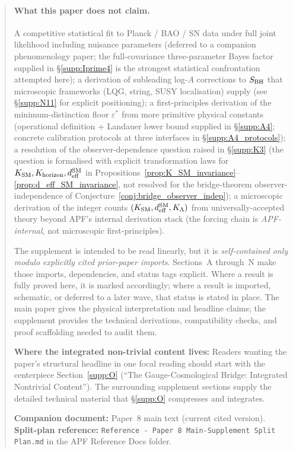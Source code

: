 \documentclass[11pt]{article}
\theoremstyle{plain}
\theoremstyle{definition}
\theoremstyle{remark}
\begin{document}
\begin{abstract}
\paragraph{What this paper does not claim.}  A competitive statistical fit to Planck / BAO / SN data under full joint likelihood including nuisance parameters (deferred to a companion phenomenology paper; the full-covariance three-parameter Bayes factor supplied in \S\ref{supp:Iprime4} is the strongest statistical confrontation attempted here); a derivation of subleading log-$A$ corrections to $S_{\rm BH}$ that microscopic frameworks (LQG, string, SUSY localisation) supply (see \S\ref{supp:N11} for explicit positioning); a first-principles derivation of the minimum-distinction floor $\varepsilon^*$ from more primitive physical constants (operational definition + Landauer lower bound supplied in \S\ref{supp:A4}; concrete calibration protocols at three interfaces in \S\ref{supp:A4_protocols}); a resolution of the observer-dependence question raised in \S\ref{supp:K3} (the question is formalised with explicit transformation laws for $K_{\rm SM}, K_{\rm horizon}, d_{\rm eff}^{\rm SM}$ in Propositions~\ref{prop:K_SM_invariance}--\ref{prop:d_eff_SM_invariance}, not resolved for the bridge-theorem observer-independence of Conjecture~\ref{conj:bridge_observer_indep}); a microscopic derivation of the integer counts $(K_{\rm SM}, d_{\rm eff}^{\rm SM}, K_\Lambda)$ from universally-accepted theory beyond APF's internal derivation stack (the forcing chain is \emph{APF-internal}, not microscopic first-principles).

\medskip

\noindent The supplement is intended to be read linearly, but it is \emph{self-contained only modulo explicitly cited prior-paper imports}.  Sections~A through~N make those imports, dependencies, and status tags explicit.  Where a result is fully proved here, it is marked accordingly; where a result is imported, schematic, or deferred to a later wave, that status is stated in place.  The main paper gives the physical interpretation and headline claims; the supplement provides the technical derivations, compatibility checks, and proof scaffolding needed to audit them.

\medskip

\medskip

\noindent\textbf{Where the integrated non-trivial content lives:} Readers wanting the paper's structural headline in one focal reading should start with the centerpiece Section~\ref{supp:O} (``The Gauge-Cosmological Bridge: Integrated Nontrivial Content'').  The surrounding supplement sections supply the detailed technical material that \S\ref{supp:O} compresses and integrates.

\medskip

\noindent\textbf{Companion document:} Paper~8 main text (current cited version).\\
\textbf{Split-plan reference:} \texttt{Reference - Paper 8 Main-Supplement Split Plan.md} in the APF Reference Docs folder.
\end{abstract}
\end{document}
